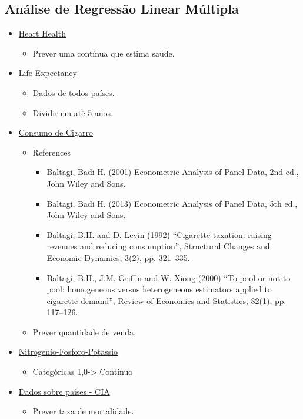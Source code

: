 \documentclass[12pt,a4paper]{article}
\begin{document}
\subsection{Análise de Regressão Linear Múltipla}
\label{sec:org321b6cb}
\begin{itemize}
\item \href{data/csv/heart.csv}{Heart Health}
\begin{itemize}
\item Prever uma contínua que estima saúde.
\end{itemize}
\item \href{data/Life\_Expectancy\_Data.csv}{Life Expectancy}
\begin{itemize}
\item Dados de todos países.
\item Dividir em até 5 anos.
\end{itemize}
\item \href{https://r-data.pmagunia.com/dataset/r-dataset-package-plm-cigar}{Consumo de Cigarro}
\begin{itemize}
\item References
\begin{itemize}
\item Baltagi, Badi H. (2001) Econometric Analysis of Panel Data, 2nd ed., John Wiley and Sons.
\item Baltagi, Badi H. (2013) Econometric Analysis of Panel Data, 5th ed., John Wiley and Sons.
\item Baltagi, B.H. and D. Levin (1992) “Cigarette taxation: raising revenues and reducing consumption”, Structural Changes and Economic Dynamics, 3(2), pp. 321–335.
\item Baltagi, B.H., J.M. Griffin and W. Xiong (2000) “To pool or not to pool: homogeneous versus heterogeneous estimators applied to cigarette demand”, Review of Economics and Statistics, 82(1), pp. 117–126.
\end{itemize}
\item Prever quantidade de venda.
\end{itemize}
\item \href{https://r-data.pmagunia.com/dataset/npk}{Nitrogenio-Fosforo-Potassio}
\begin{itemize}
\item Categóricas 1,0-> Contínuo
\end{itemize}
\item \href{https://r-data.pmagunia.com/dataset/openintro-statistics-dataset-ciafactbook}{Dados sobre países - CIA}
\begin{itemize}
\item Prever taxa de mortalidade.
\end{itemize}
\end{itemize}
\end{document}
